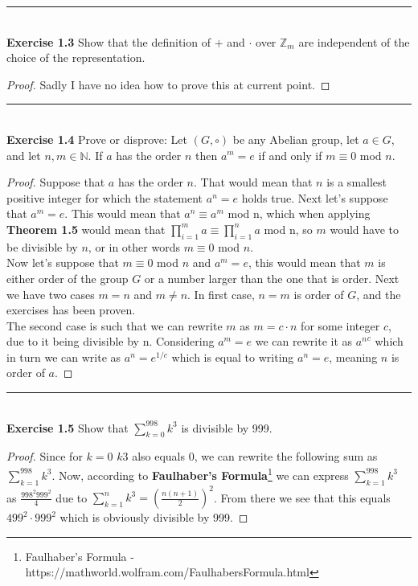 \documentclass[a4paper]{article}
\begin{document}
\noindent\rule{12cm}{0.4pt}\\
\noindent \textbf{Exercise 1.3} Show that the definition of $+$ and $\cdot$ over $\mathbb{Z}_m$ are independent of the choice of the representation.
\begin{proof}
Sadly I have no idea how to prove this at current point.
\end{proof}



\noindent\rule{12cm}{0.4pt}\\
\noindent \textbf{Exercise 1.4} Prove or disprove: Let $(G, \circ)$ be any Abelian group, let $a \in G$, and let $n, m \in \mathbb{N}$. If $a$ has the order $n$ then $a^m=e$ if and only if $m \equiv 0$ mod $n$.
\begin{proof}
Suppose that $a$ has the order $n$. That would mean that $n$ is a smallest positive integer for which the statement $a^n=e$ holds true. Next let's suppose that $a^m=e$. This would mean that $a^n \equiv a^m$ mod n, which when applying \textbf{Theorem 1.5} would mean that $\prod_{i=1}^{m} a \equiv \prod_{i=1}^{n} a$ mod n, so $m$ would have to be divisible by $n$, or in other words $m \equiv 0$ mod $n$.\\
Now let's suppose that $m \equiv 0$ mod $n$ and $a^m=e$, this would mean that $m$ is either order of the group $G$ or a number larger than the one that is order. Next we have two cases $m=n$ and $m \neq n$. In first case, $n=m$ is order of $G$, and the exercises has been proven.\\
The second case is such that we can rewrite $m$ as $m=c\cdot n$ for some integer $c$, due to it being divisible by n. Considering $a^m=e$ we can rewrite it as ${a^n}^c$ which in turn we can write as $a^n=e^{1/c}$ which is equal to writing $a^n=e$, meaning $n$ is order of $a$.
\end{proof}



\noindent\rule{12cm}{0.4pt}\\
\noindent \textbf{Exercise 1.5} Show that $\sum_{k=0}^{998} k^3$ is divisible by 999.
\begin{proof}
Since for $k=0$ $k3$ also equals 0, we can rewrite the following sum as $\sum_{k=1}^{998} k^3$. Now, according to \textbf{Faulhaber's Formula}\footnote{Faulhaber's Formula - https://mathworld.wolfram.com/FaulhabersFormula.html} we can express $\sum_{k=1}^{998} k^3$ as $\frac{998^2 999^2}{4}$ due to $\sum_{k=1}^{n} k^3=\left( \frac{n(n+1)}{2}\right)^2$. From there we see that this equals $499^2 \cdot 999^2$ which is obviously divisible by 999.
\end{proof}
\end{document}

